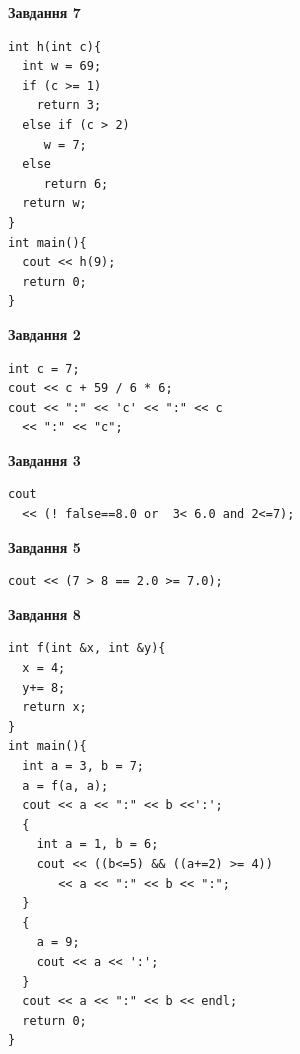 \documentclass[12pt, ukrainian]{article}
\begin{document}
{\begin {large}
\begin{minipage}[t]{7.0cm}
\begin{center}
\textbf{Завдання 7}
\end{center}
\vspace{-8mm}

\begin{verbatim}
int h(int c){
  int w = 69;
  if (c >= 1)
    return 3;
  else if (c > 2)
     w = 7;
  else
     return 6;
  return w;
}
int main(){
  cout << h(9);
  return 0;
}
\end{verbatim}

\end{minipage}
\vline \hspace{1mm}
\begin{minipage}[t]{11.0cm}

\begin{center}
\textbf{Завдання 2}
\end{center}
\vspace{-8mm}

\begin{verbatim}
int c = 7;
cout << c + 59 / 6 * 6;
cout << ":" << 'c' << ":" << c 
  << ":" << "c";
\end{verbatim}



\begin{center}
\textbf{Завдання 3}
\end{center}
\vspace{-8mm}

\begin{verbatim}
cout 
  << (! false==8.0 or  3< 6.0 and 2<=7);
\end{verbatim}



\begin{center}
\textbf{Завдання 5}
\end{center}
\vspace{-8mm}

\begin{verbatim}
cout << (7 > 8 == 2.0 >= 7.0);
\end{verbatim}



\begin{center}
\textbf{Завдання 8}
\end{center}
\vspace{-8mm}

\begin{verbatim}
int f(int &x, int &y){
  x = 4;
  y+= 8;
  return x;
}
int main(){
  int a = 3, b = 7;
  a = f(a, a);
  cout << a << ":" << b <<':';
  {
    int a = 1, b = 6;
    cout << ((b<=5) && ((a+=2) >= 4))
       << a << ":" << b << ":";
  }
  {
    a = 9;
    cout << a << ':';
  }
  cout << a << ":" << b << endl;
  return 0;
}
\end{verbatim}


\end{minipage}
\end{large}}
\end{document}
